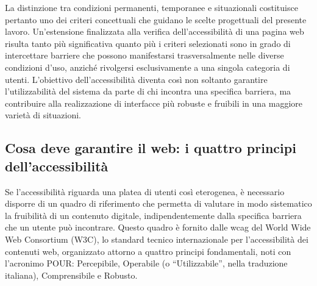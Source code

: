 La distinzione tra condizioni permanenti, temporanee e situazionali costituisce pertanto uno dei criteri concettuali che guidano le scelte progettuali del presente lavoro. Un'estensione finalizzata alla verifica dell'accessibilità di una pagina web risulta tanto più significativa quanto più i criteri selezionati sono in grado di intercettare barriere che possono manifestarsi trasversalmente nelle diverse condizioni d'uso, anziché rivolgersi esclusivamente a una singola categoria di utenti. L'obiettivo dell'accessibilità diventa così non soltanto garantire l'utilizzabilità del sistema da parte di chi incontra una specifica barriera, ma contribuire alla realizzazione di interfacce più robuste e fruibili in una maggiore varietà di situazioni.

\subsection{Cosa deve garantire il web: i quattro principi dell'accessibilità}
\label{subsec:quattro-principi}

Se l'accessibilità riguarda una platea di utenti così eterogenea, è necessario disporre di un quadro di riferimento che permetta di valutare in modo sistematico la fruibilità di un contenuto digitale, indipendentemente dalla specifica barriera che un utente può incontrare. Questo quadro è fornito dalle \gls{wcag} del World Wide Web Consortium (W3C), lo standard tecnico internazionale per l'accessibilità dei contenuti web, organizzato attorno a quattro principi fondamentali, noti con l'acronimo POUR: Percepibile, Operabile (o \enquote{Utilizzabile}, nella traduzione italiana), Comprensibile e Robusto.

